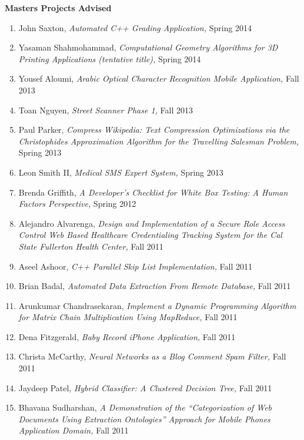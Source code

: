 \documentclass[11pt]{letter}
\begin{document}
\textbf{Masters Projects Advised}
\begin{enumerate}
\item John Saxton, \emph{Automated C++ Grading Application,} Spring 2014
\item Yasaman Shahmohammad, \emph{Computational Geometry Algorithms for 3D Printing Applications (tentative title),} Spring 2014
\item Yousef Aloumi, \emph{Arabic Optical Character Recognition Mobile Application,} Fall 2013
\item Toan Nguyen, \emph{Street Scanner Phase 1,} Fall 2013
\item Paul Parker, \emph{Compress Wikipedia: Text Compression Optimizations via the Christophides Approximation Algorithm for the Travelling Salesman Problem,} Spring 2013
\item Leon Smith II, \emph{Medical SMS Expert System,} Spring 2013
\item Brenda Griffith, \emph{A Developer’s Checklist for White Box Testing: A Human Factors Perspective,} Spring 2012
\item Alejandro Alvarenga, \emph{Design and Implementation of a Secure Role Access Control Web Based Healthcare Credentialing Tracking System for the Cal State Fullerton Health Center,} Fall 2011
\item Aseel Ashoor, \emph{C++ Parallel Skip List Implementation,} Fall 2011
\item Brian Badal, \emph{Automated Data Extraction From Remote Database,} Fall 2011
\item Arunkumar Chandrasekaran, \emph{Implement a Dynamic Programming Algorithm for Matrix Chain Multiplication Using MapReduce,} Fall 2011
\item Dena Fitzgerald, \emph{Baby Record iPhone Application,} Fall 2011
\item Christa McCarthy, \emph{Neural Networks as a Blog Comment Spam Filter,} Fall 2011
\item Jaydeep Patel, \emph{Hybrid Classifier: A Clustered Decision Tree,} Fall 2011
\item Bhavana Sudharshan, \emph{A Demonstration of the ``Categorization of Web Documents Using Extraction Ontologies'' Approach for Mobile Phones Application Domain,} Fall 2011
\end{enumerate}
\end{document}
